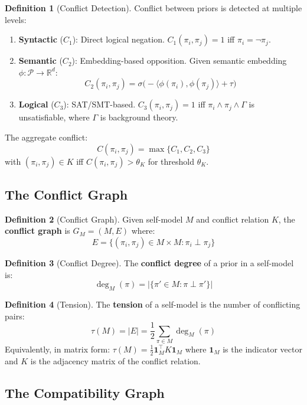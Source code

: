 \documentclass[12pt,a4paper]{article}
\theoremstyle{definition}
\newtheorem{definition}{Definition}[section]
\begin{document}
\begin{definition}[Conflict Detection]
Conflict between priors is detected at multiple levels:
\begin{enumerate}
    \item \textbf{Syntactic} ($C_1$): Direct logical negation. $C_1(\pi_i, \pi_j) = 1$ iff $\pi_i = \neg \pi_j$.
    
    \item \textbf{Semantic} ($C_2$): Embedding-based opposition. Given semantic embedding $\phi: \mathcal{P} \to \mathbb{R}^d$:
    \[ C_2(\pi_i, \pi_j) = \sigma\big(-\langle \phi(\pi_i), \phi(\pi_j) \rangle + \tau\big) \]
    
    \item \textbf{Logical} ($C_3$): SAT/SMT-based. $C_3(\pi_i, \pi_j) = 1$ iff $\pi_i \land \pi_j \land \Gamma$ is unsatisfiable, where $\Gamma$ is background theory.
\end{enumerate}
The aggregate conflict:
\[ C(\pi_i, \pi_j) = \max\{C_1, C_2, C_3\} \]
with $(\pi_i, \pi_j) \in K$ iff $C(\pi_i, \pi_j) > \theta_K$ for threshold $\theta_K$.
\end{definition}

\subsection{The Conflict Graph}

\begin{definition}[Conflict Graph]
Given self-model $M$ and conflict relation $K$, the \textbf{conflict graph} is $G_M = (M, E)$ where:
\[ E = \{(\pi_i, \pi_j) \in M \times M : \pi_i \perp \pi_j\} \]
\end{definition}

\begin{definition}[Conflict Degree]
The \textbf{conflict degree} of a prior in a self-model is:
\[ \deg_M(\pi) = |\{\pi' \in M : \pi \perp \pi'\}| \]
\end{definition}

\begin{definition}[Tension]
The \textbf{tension} of a self-model is the number of conflicting pairs:
\[ \tau(M) = |E| = \frac{1}{2}\sum_{\pi \in M} \deg_M(\pi) \]
Equivalently, in matrix form: $\tau(M) = \frac{1}{2} \mathbf{1}_M^\top K \mathbf{1}_M$ where $\mathbf{1}_M$ is the indicator vector and $K$ is the adjacency matrix of the conflict relation.
\end{definition}

\subsection{The Compatibility Graph}
\end{document}
